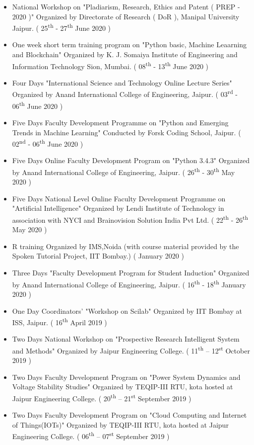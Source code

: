 \documentclass[10pt,a4paper,ragged2e,withhyper]{altacv}
\begin{document}
\begin{paracol}{2}
\begin{itemize}
\item National Workshop on "Pladiarism, Research, Ethics and Patent ( PREP - 2020 )" Organized by Directorate of Research ( DoR ), Manipal University Jaipur. ( 25\textsuperscript{th} - 27\textsuperscript{th} June 2020 )
\item One week short term training program on "Python basic, Machine Leaarning and Blockchain" Organized by K. J. Somaiya Institute of Engineering and Information Technology Sion, Mumbai. ( 08\textsuperscript{th} - 13\textsuperscript{th} June 2020 )
\item Four Days "International Science and Technology Online Lecture Series" Organized by Anand International College of Engineering, Jaipur. ( 03\textsuperscript{rd} - 06\textsuperscript{th} June 2020 )
\item Five  Days Faculty Development Programme on "Python and Emerging Trends in Machine Learning" Conducted by Forsk Coding School, Jaipur. ( 02\textsuperscript{nd} - 06\textsuperscript{th} June 2020 )
\item Five  Days Online Faculty Development Program on "Python 3.4.3" Organized by Anand International College of Engineering, Jaipur. ( 26\textsuperscript{th} - 30\textsuperscript{th} May 2020 )
\item Five  Days National Level Online Faculty Development Programme on "Artificial Intelligence" Organized by Lendi Institute of Technology in association with NYCI and Brainovision Solution India Pvt Ltd. ( 22\textsuperscript{th} - 26\textsuperscript{th} May 2020 )
\item R training Organized by IMS,Noida (with course material provided by the Spoken Tutorial Project, IIT Bombay.) ( January 2020 )
\item Three Days "Faculty Development Program for Student Induction" Organized by Anand International College of Engineering, Jaipur. ( 16\textsuperscript{th} - 18\textsuperscript{th} January 2020 )
\item One Day Coordinators' "Workshop on Scilab" Organized by IIT Bombay at ISS, Jaipur. ( 16\textsuperscript{th} April 2019 )
\item Two Days National Workshop on "Prospective Research Intelligent System and Methods" Organized by  Jaipur Engineering College. ( 11\textsuperscript{th} – 12\textsuperscript{st} October 2019 )
\item Two Days Faculty Development Program on "Power System Dynamics and Voltage Stability Studies" Organized by TEQIP-III RTU, kota hosted at Jaipur Engineering College. ( 20\textsuperscript{th} – 21\textsuperscript{st} September 2019 )
\item Two Days Faculty Development Program on "Cloud Computing and Internet of Things(IOTs)" Organized by TEQIP-III RTU, kota hosted at Jaipur Engineering College. ( 06\textsuperscript{th} – 07\textsuperscript{st} September 2019 )


\end{itemize}
\end{paracol}
\end{document}
